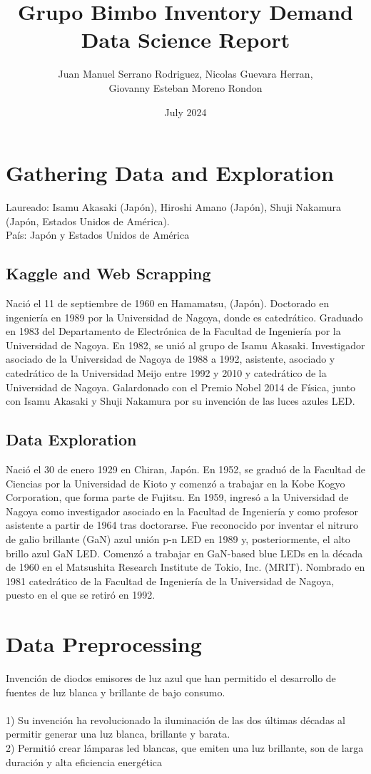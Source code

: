 \documentclass{article}
\title{Grupo Bimbo Inventory Demand \\Data Science Report }
\author{Juan Manuel Serrano Rodriguez, Nicolas Guevara Herran,\\ Giovanny Esteban Moreno Rondon}
\date{July 2024}
\begin{document}
\maketitle

\section{Gathering Data and Exploration}
Laureado: Isamu Akasaki (Japón), Hiroshi Amano (Japón), Shuji Nakamura (Japón, Estados Unidos de América).\\
País: Japón y Estados Unidos de América
\subsection{Kaggle and Web Scrapping}
Nació el 11 de septiembre de 1960 en Hamamatsu, (Japón). Doctorado en ingeniería en 1989 por la Universidad de Nagoya, donde es catedrático. Graduado en 1983 del Departamento de Electrónica de la Facultad de Ingeniería por la Universidad de Nagoya. En 1982, se unió al grupo de Isamu Akasaki. Investigador asociado de la Universidad de Nagoya de 1988 a 1992, asistente, asociado y catedrático de la Universidad Meijo entre 1992 y 2010 y catedrático de la Universidad de Nagoya. Galardonado con el Premio Nobel 2014 de Física, junto con Isamu Akasaki y Shuji Nakamura por su invención de las luces azules LED.
\subsection{Data Exploration}
Nació el 30 de enero 1929 en Chiran, Japón. En 1952, se graduó de la Facultad de Ciencias por la Universidad de Kioto y comenzó a trabajar en la Kobe Kogyo Corporation, que forma parte de Fujitsu. En 1959, ingresó a la Universidad de Nagoya como investigador asociado en la Facultad de Ingeniería y como profesor asistente a partir de 1964 tras doctorarse. Fue reconocido por inventar el nitruro de galio brillante (GaN) azul unión p-n LED en 1989 y, posteriormente, el alto brillo azul GaN LED. Comenzó a trabajar en GaN-based blue LEDs en la década de 1960 en el Matsushita Research Institute de Tokio, Inc. (MRIT). Nombrado en 1981 catedrático de la Facultad de Ingeniería de la Universidad de Nagoya, puesto en el que se retiró en 1992.

\section{Data Preprocessing}
Invención de diodos emisores de luz azul que han permitido el desarrollo de fuentes de luz blanca y brillante de bajo consumo.\\\\
1) Su invención ha revolucionado la iluminación de las dos últimas décadas al permitir generar una luz blanca, brillante y barata.\\
2) Permitió crear lámparas led blancas, que emiten una luz brillante, son de larga duración y alta eficiencia energética
\end{document}
